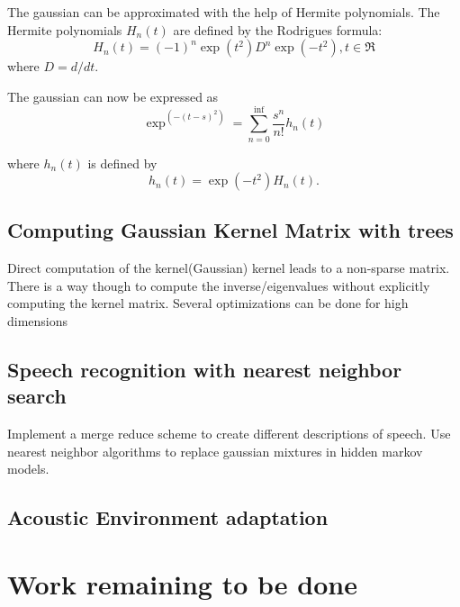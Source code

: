 \documentclass[12pt,letterpaper,doublespaced,ETD,dvips,proposal]{gtthesis}
\begin{document}
\begin{Body}
The gaussian can be approximated with the help of Hermite
polynomials. The Hermite polynomials $H_n(t)$ are defined by the
Rodrigues formula:
\begin{equation}
  H_n(t)=(-1)^n\exp(t^2)D^n\exp(-t^2), t\in \Re
\end{equation}
where $D=d/dt$.

The gaussian can now be expressed as
\begin{equation}
\exp^(-(t-s)^2)=\sum_{n=0}^{\inf}\frac{s^n}{n!}h_n(t)
\end{equation}

where $h_n(t)$ is defined by
\begin{equation}
h_n(t)=\exp(-t^2)H_n(t).
\end{equation}

\subsection{Computing Gaussian Kernel Matrix with trees}
Direct computation of the kernel(Gaussian) kernel leads to a
non-sparse matrix. There is a way though to compute the
inverse/eigenvalues without explicitly computing the kernel matrix.
Several optimizations can be done for high dimensions


\subsection{Speech recognition with nearest neighbor search}
Implement a merge reduce scheme to create different descriptions of
speech. Use nearest neighbor algorithms to replace gaussian mixtures
in hidden markov models.

\subsection{Acoustic Environment adaptation}

\section{Work remaining to be done}
\label{remains}

\end{Body}

\begin{EndMatter}


\index %
\end{EndMatter}
\end{document}
